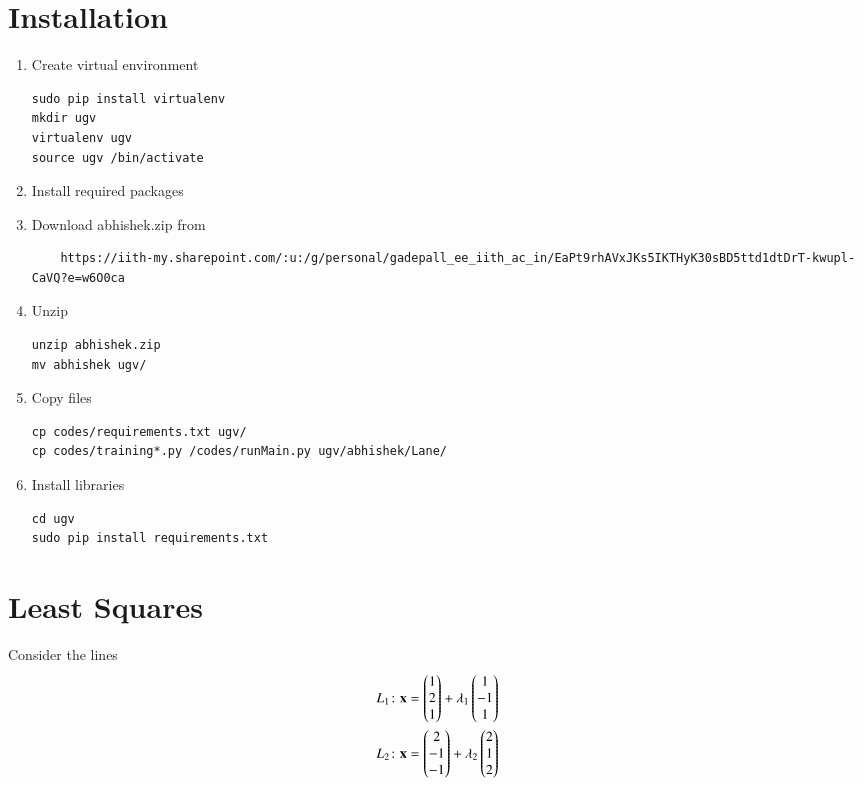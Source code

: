 \documentclass[journal,12pt,twocolumn]{IEEEtran}
\renewcommand\thesection{\arabic{section}}
\begin{document}
%


\section{Installation}
\begin{enumerate}[label=\thesection.\arabic*.,ref=\thesection.\theenumi]
\item Create virtual environment
\begin{lstlisting}
sudo pip install virtualenv 
mkdir ugv
virtualenv ugv
source ugv /bin/activate
\end{lstlisting}
\item Install required packages
\item Download abhishek.zip from 
\begin{lstlisting}
	https://iith-my.sharepoint.com/:u:/g/personal/gadepall_ee_iith_ac_in/EaPt9rhAVxJKs5IKTHyK30sBD5ttd1dtDrT-kwupl-CaVQ?e=w6O0ca
\end{lstlisting}
\item Unzip 
\begin{lstlisting}
unzip abhishek.zip
mv abhishek ugv/
\end{lstlisting}
\item Copy files
\begin{lstlisting}
cp codes/requirements.txt ugv/
cp codes/training*.py /codes/runMain.py ugv/abhishek/Lane/
\end{lstlisting}
\item Install libraries
\begin{lstlisting}
cd ugv
sudo pip install requirements.txt
\end{lstlisting}
\end{enumerate}

\section{Least Squares}
Consider the lines 
\begin{align}
    L_1\colon \mathbf{x}=\begin{pmatrix}1\\2\\1\end{pmatrix}+\lambda_1\begin{pmatrix}1\\-1\\1\end{pmatrix}\label{eq:pseudo:1}\\
    L_2\colon \mathbf{x}=\begin{pmatrix}2\\-1\\-1\end{pmatrix}+\lambda_2\begin{pmatrix}2\\1\\2\end{pmatrix}\label{eq:pseudo:2}
\end{align}
\end{document}
